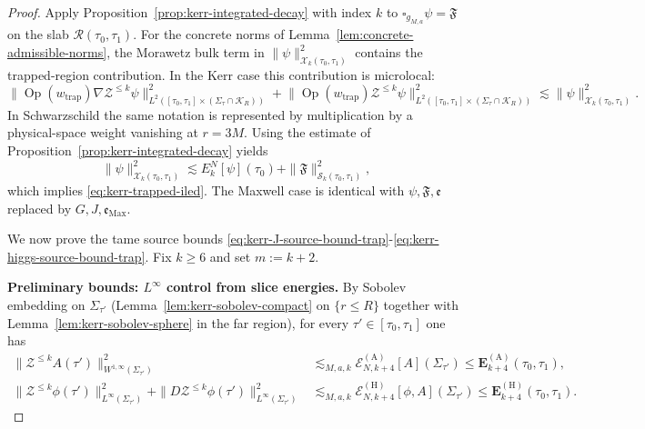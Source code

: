 \documentclass[11pt]{article}
\numberwithin{equation}{section}
\theoremstyle{plain}
\theoremstyle{definition}
\theoremstyle{remark}
\begin{document}
\begin{proof}
Apply Proposition~\ref{prop:kerr-integrated-decay} with index $k$ to $\square_{g_{M,a}}\psi=\mathfrak{F}$ on the slab $\mathcal R(\tau_{0},\tau_{1})$.
For the concrete norms of Lemma~\ref{lem:concrete-admissible-norms}, the Morawetz bulk term in $\|\psi\|_{\mathcal X_{k}(\tau_{0},\tau_{1})}^{2}$ contains the trapped-region contribution. In the Kerr case this contribution is microlocal:
\begin{equation}
\bigl\|\operatorname{Op}(w_{\mathrm{trap}})\nabla\mathcal Z^{\le k}\psi\bigr\|_{L^{2}([\tau_0,\tau_1]\times(\Sigma_\tau\cap\mathcal K_R))}^{2}
+
\bigl\|\operatorname{Op}(w_{\mathrm{trap}})\mathcal Z^{\le k}\psi\bigr\|_{L^{2}([\tau_0,\tau_1]\times(\Sigma_\tau\cap\mathcal K_R))}^{2}
\lesssim
\|\psi\|_{\mathcal X_{k}(\tau_{0},\tau_{1})}^{2}.
\end{equation}
In Schwarzschild the same notation is represented by multiplication by a physical-space weight vanishing at $r=3M$.
Using the estimate of Proposition~\ref{prop:kerr-integrated-decay} yields
\begin{equation}
\|\psi\|_{\mathcal X_{k}(\tau_{0},\tau_{1})}^{2}
\lesssim
E^{N}_{k}[\psi](\tau_{0})
+
\|\mathfrak{F}\|_{\mathcal S_{k}(\tau_{0},\tau_{1})}^{2},
\end{equation}
which implies \eqref{eq:kerr-trapped-iled}.
The Maxwell case is identical with $\psi,\mathfrak{F},\mathfrak e$ replaced by $G,J,\mathfrak e_{\mathrm{Max}}$.

\smallskip
We now prove the tame source bounds
\eqref{eq:kerr-J-source-bound-trap}-\eqref{eq:kerr-higgs-source-bound-trap}.
Fix $k\ge 6$ and set $m:=k+2$.

\smallskip\noindent
\textbf{Preliminary bounds: $L^\infty$ control from slice energies.}
By Sobolev embedding on $\Sigma_{\tau'}$ (Lemma~\ref{lem:kerr-sobolev-compact} on $\{r\le R\}$ together with Lemma~\ref{lem:kerr-sobolev-sphere} in the far region),
for every $\tau'\in[\tau_{0},\tau_{1}]$ one has
\begin{eqnarray}
\|\mathcal Z^{\le k}A(\tau')\|_{W^{1,\infty}(\Sigma_{\tau'})}^{2}
&\lesssim_{M,a,k}
\mathcal E_{N,k+4}^{(\mathrm A)}[A](\Sigma_{\tau'})
\le \mathbf E_{k+4}^{(\mathrm A)}(\tau_0,\tau_1),\\
\|\mathcal Z^{\le k}\phi(\tau')\|_{L^{\infty}(\Sigma_{\tau'})}^{2}
+\|D\mathcal Z^{\le k}\phi(\tau')\|_{L^{\infty}(\Sigma_{\tau'})}^{2}
&\lesssim_{M,a,k}
\mathcal E_{N,k+4}^{(\mathrm H)}[\phi,A](\Sigma_{\tau'})
\le \mathbf E_{k+4}^{(\mathrm H)}(\tau_0,\tau_1).
\end{eqnarray}


\end{proof}
\end{document}
